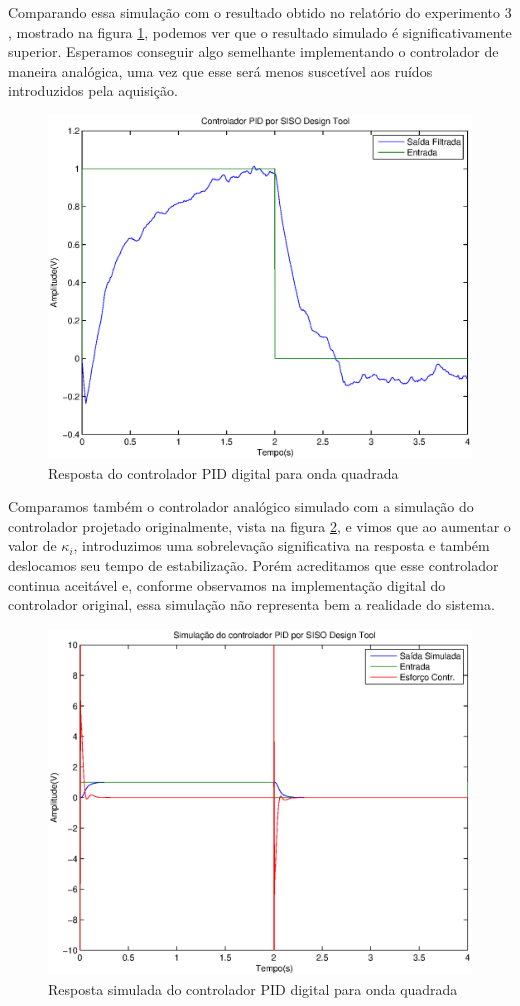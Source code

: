 \documentclass{article}
\begin{document}
Comparando essa simulação com o resultado obtido no relatório do experimento 3 \cite{bb:lab3}, mostrado na figura \ref{fig:ypids2}, podemos ver que o resultado simulado é significativamente superior. Esperamos conseguir algo semelhante implementando o controlador de maneira analógica, uma vez que esse será menos suscetível aos ruídos introduzidos pela aquisição. 
\begin{figure}[H]
	\centering
	\includegraphics[width=0.8\linewidth]{ypids2}
	\caption{Resposta do controlador PID digital para onda quadrada}
	\label{fig:ypids2}
\end{figure}
Comparamos também o controlador analógico simulado com a simulação do controlador projetado originalmente, vista na figura \ref{fig:yusimpids}, e vimos que ao aumentar o valor de $\kappa_i$, introduzimos uma sobrelevação significativa na resposta e também deslocamos seu tempo de estabilização. Porém acreditamos que esse controlador continua aceitável e, conforme observamos na implementação digital do controlador original, essa simulação não representa bem a realidade do sistema.
\begin{figure}[H]
	\centering
	\includegraphics[width=0.8\linewidth]{yusimpids}
	\caption{Resposta simulada do controlador PID digital para onda quadrada}
	\label{fig:yusimpids}
\end{figure}
\begin{thebibliography}{widestlabel}
\end{thebibliography}
\end{document}
